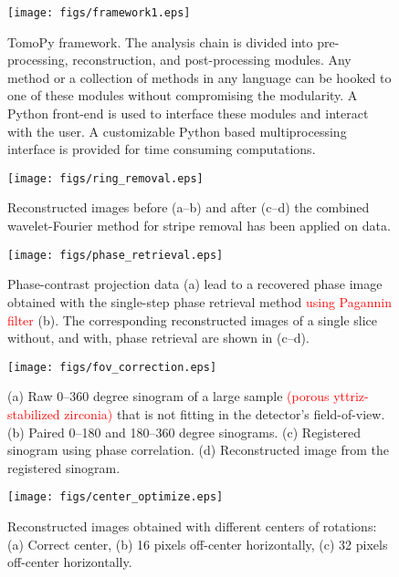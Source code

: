 \documentclass[pdf]{iucr}              %
\begin{document}


\begin{figure}
\centering
\texttt{[image: figs/framework1.eps]}
\caption{TomoPy framework. The analysis chain is divided into pre-processing, reconstruction, and post-processing modules. Any method or a collection of methods in any language can be hooked to one of these modules without compromising the modularity. A Python front-end is used to interface these modules and interact with the user. A customizable Python based multiprocessing interface is provided for time consuming computations.}
\label{fig:Framework}
\end{figure}

\begin{figure}
\centering
\texttt{[image: figs/ring\_removal.eps]}
\caption{Reconstructed images before (a--b) and after (c--d) the combined wavelet-Fourier method for stripe removal has been applied on data.}
\label{fig:ProcessRing}
\end{figure}

\begin{figure}
\centering
\texttt{[image: figs/phase\_retrieval.eps]}
\caption{Phase-contrast projection data (a) lead to a recovered phase image obtained with the single-step phase retrieval method \textcolor{red}{using Pagannin filter} (b). The corresponding reconstructed images of a single slice without, and with, phase retrieval are shown in (c--d).}
\label{fig:ProcessPhase}
\end{figure}

\begin{figure}
\centering
\texttt{[image: figs/fov\_correction.eps]}
\caption{(a) Raw 0--360 degree sinogram of a large sample \textcolor{red}{(porous yttriz-stabilized zirconia)} that is not fitting in the detector's field-of-view. (b) Paired 0--180 and 180--360 degree sinograms. (c) Registered sinogram using phase correlation. (d) Reconstructed image from the registered sinogram.}
\label{fov_correction}
\end{figure}

\begin{figure}
\centering
\texttt{[image: figs/center\_optimize.eps]}
\caption{Reconstructed images obtained with different centers of rotations: (a) Correct center, (b) 16 pixels  off-center horizontally, (c) 32 pixels off-center horizontally.}
\label{OptimizeCenter1}
\end{figure}
\end{document}
